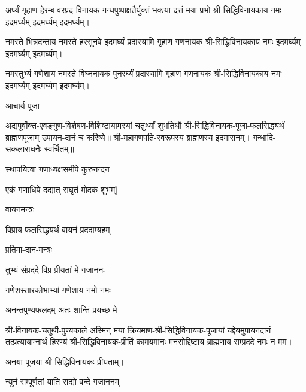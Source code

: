 \begin{center}
\twolineshloka
{अर्घ्यं गृहाण हेरम्ब वरप्रद विनायक}
{गन्धपुष्पाक्षतैर्युक्तं भक्त्या दत्तं मया प्रभो}
श्री-सिद्धिविनायकाय नमः इदमर्घ्यम् इदमर्घ्यम् इदमर्घ्यम्।

\twolineshloka
{नमस्ते भिन्नदन्ताय नमस्ते हरसूनवे}
{इदमर्घ्यं प्रदास्यामि गृहाण गणनायक}
श्री-सिद्धिविनायकाय नमः इदमर्घ्यम् इदमर्घ्यम् इदमर्घ्यम्।

\twolineshloka
{नमस्तुभ्यं गणेशाय नमस्ते विघ्ननायक}
{पुनरर्घ्यं प्रदास्यामि गृहाण गणनायक}
श्री-सिद्धिविनायकाय नमः इदमर्घ्यम् इदमर्घ्यम् इदमर्घ्यम्।

\centerline{आचार्य पूजा}

अद्यपूर्वोक्त-एवङ्गुण-विशेषण-विशिष्टायामस्यां चतुर्थ्यां शुभतिथौ श्री-सिद्धिविनायक-पूजा-फलसिद्ध्यर्थं ब्राह्मणपूजाम् उपायन-दानं च करिष्ये॥ 
श्री-महागणपति-स्वरूपस्य ब्राह्मणस्य इदमासनम्। गन्धादि-सकलाराधनैः स्वर्चितम्॥

\twolineshloka*
{[अथैकविंशतिं गृह्य मोदकान् घृतपाचितान्}
{स्थापयित्वा गणाध्यक्षसमीपे कुरुनन्दन}

{एकं गणाधिपे दद्यात् सघृतं मोदकं शुभम्]}

\centerline{वायनमन्त्रः}

{विप्राय फलसिद्धयर्थं वायनं प्रददाम्यहम्} 

\centerline{प्रतिमा-दान-मन्त्रः}

{तुभ्यं संप्रददे विप्र प्रीयतां में गजाननः}

{गणेशस्तारकोभाभ्यां गणेशाय नमो नमः}

{अनन्तपुण्यफलदम् अतः शान्तिं प्रयच्छ मे}

श्री-विनायक-चतुर्थी-पुण्यकाले अस्मिन् मया क्रियमाण-श्री-सिद्धिविनायक-पूजायां
यद्देयमुपायनदानं तत्प्रत्यायाम्नार्थं हिरण्यं श्री-सिद्धिविनायक-प्रीतिं
कामयमानः मनसोद्दिष्टाय ब्राह्मणाय सम्प्रददे नमः न मम।

अनया पूजया श्री-सिद्धिविनायकः प्रीयताम्। 






{न्यूनं सम्पूर्णतां याति सद्यो वन्दे गजाननम्} 


\end{center}
